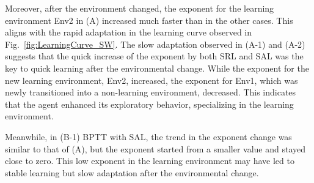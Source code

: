 Moreover, after the environment changed, the exponent for the learning environment Env2 in (A)
increased much faster than in the other cases.
This aligns with the rapid adaptation in the learning curve observed in Fig.~\ref{fig:LearningCurve_SW}.
The slow adaptation observed in (A-1) and (A-2) suggests that the quick increase of the exponent
by both SRL and SAL was the key to quick learning after the environmental change.
While the exponent for the new learning environment, Env2, increased,
the exponent for Env1, which was newly transitioned into a non-learning environment, decreased.
This indicates that the agent enhanced its exploratory behavior, specializing in the learning environment.

Meanwhile, in (B-1) BPTT with SAL, the trend in the exponent change was similar to that of (A),
but the exponent started from a smaller value and stayed close to zero.
This low exponent in the learning environment may have led to stable learning but slow adaptation
after the environmental change.

